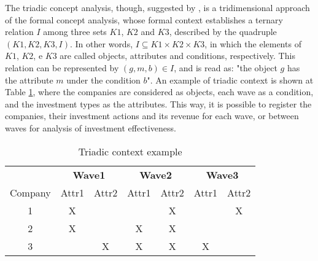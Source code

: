 \documentclass[a4paper,twoside]{article}
\begin{document}
The triadic concept analysis, though, suggested by \cite{lehmann:95}, is a tridimensional approach of the formal concept analysis, whose formal context establishes a ternary relation $I$ among three sets $K1$, $K2$ and $K3$, described by the quadruple $(K1, K2, K3, I)$. In other words, $I \subseteq K1 \times K2 \times K3$, in which the elements of $K1$, $K2$, e $K3$ are called objects, attributes and conditions, respectively. This relation can be represented by $(g,m,b) \in I$, and is read as: "the object $g$ has the attribute $m$ under the condition $b$". An example of triadic context is shown at Table \ref{Tabela:1}, where the companies are considered as objects, each wave as a condition, and the investment types as the attributes. This way, it is possible to register the companies, their investment actions and its revenue for each wave, or between waves for analysis of investment effectiveness.


\begin{table}[h!] 
\scriptsize
\begin{center}
\caption{Triadic context example} \label{Tabela:1}
\begin{tabular}{c|cc|cc|cc} \hline
&\multicolumn{2}{c|}{\textbf{Wave1}}&\multicolumn{2}{c|}{\textbf{Wave2}}&\multicolumn{2}{c}{\textbf{Wave3}}
\\ Company &Attr1&Attr2&Attr1&Attr2&Attr1&Attr2\\
\hline
1   & X &  
    &   & X
    &   & X \\
2   & X &  
    & X & X
    &   &   \\
3   &   & X 
    & X & X
    & X &   \\
    \hline
\end{tabular}
\end{center}
\end{table}
\vspace{-4mm}
\end{document}
